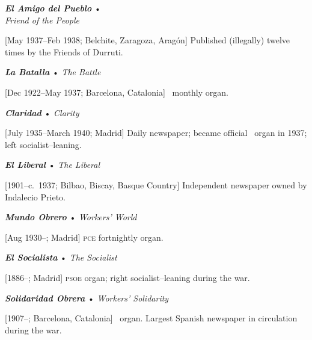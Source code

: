 \begin{multicols}{2}
  \small
  \RaggedRight
  
  \begin{minipage}{\linewidth}
  \textbf{\emph{El Amigo del Pueblo}} • \\
  \emph{Friend of the People}
  
  [May 1937--Feb 1938; Belchite, Zaragoza, Aragón]
  Published (illegal\-ly) twelve times by the Friends of Durruti. 
\end{minipage}

  \bigskip

  \begin{minipage}{\linewidth}
  \textbf{\emph{La Batalla}}
  • \emph{The Battle}

  [Dec 1922--May 1937; Barcelona, Catalonia] \POUM\ monthly organ.
\end{minipage}

  \bigskip
  
  \begin{minipage}{\linewidth}
  \textbf{\emph{Claridad}}
  • \emph{Clarity}

  [July 1935--March 1940; Madrid]
  Daily newspaper; became official \UGT\ organ in 1937; left socialist–leaning.
 
\end{minipage}
  
  \bigskip
  
  \begin{minipage}{\linewidth}
  	\textbf{\emph{El Liberal}}
 	• \emph{The Liberal}
  	
  	[1901--c.~1937; Bilbao, Biscay, Basque Country]
  	Independent newspaper owned by Indalecio Prieto.
  \end{minipage}
  

  \bigskip

  \begin{minipage}{\linewidth}
  	\textbf{\emph{Mundo Obrero}}
  	• \emph{Workers' World}
  	
  	[Aug 1930--; Madrid]
  	\textsc{pce} fortnightly organ.
  \end{minipage}
  
  \bigskip
  
  \begin{minipage}{\linewidth}
  \textbf{\emph{El Socialista}}
  • \emph{The Socialist}

  [1886--; Madrid] \textsc{psoe} organ; right socialist–leaning during the war.
  
\end{minipage}

  \bigskip
  
  \begin{minipage}{\linewidth}
  \textbf{\emph{Solidaridad Obrera}}
  • \emph{Workers’ Solidarity}

  [1907--; Barcelona, Catalonia] \CNT\ organ. Largest Spanish newspaper in circulation during the war.
  
\end{minipage}

\end{multicols}